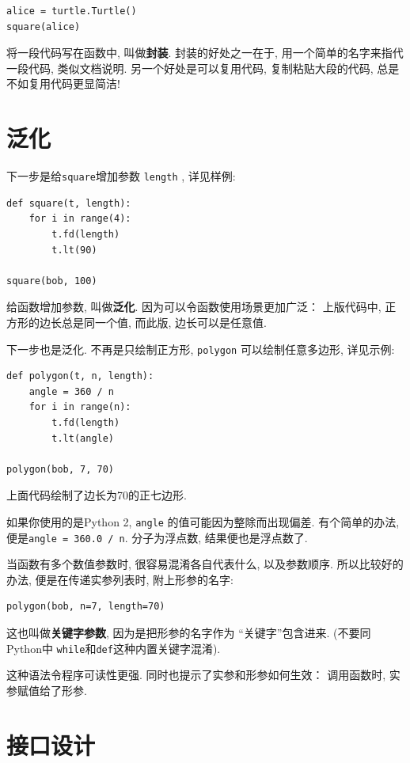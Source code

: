 \documentclass[10pt]{book}
\begin{document}
\begin{verbatim}
alice = turtle.Turtle()
square(alice)
\end{verbatim}
%
将一段代码写在函数中, 叫做{\bf 封装}. 
封装的好处之一在于, 用一个简单的名字来指代一段代码, 类似文档说明. 
另一个好处是可以复用代码, 复制粘贴大段的代码, 总是
不如复用代码更显简洁!


\section{泛化}

下一步是给{\tt square}增加参数 {\tt length} , 详见样例:

\begin{verbatim}
def square(t, length):
    for i in range(4):
        t.fd(length)
        t.lt(90)

square(bob, 100)
\end{verbatim}
%
给函数增加参数, 叫做{\bf 泛化}. 
因为可以令函数使用场景更加广泛：
上版代码中, 正方形的边长总是同一个值, 
而此版, 边长可以是任意值.

下一步也是泛化. 
不再是只绘制正方形, {\tt polygon} 可以绘制任意多边形, 详见示例:

\begin{verbatim}
def polygon(t, n, length):
    angle = 360 / n
    for i in range(n):
        t.fd(length)
        t.lt(angle)

polygon(bob, 7, 70)
\end{verbatim}
%
上面代码绘制了边长为70的正七边形. 

如果你使用的是Python 2, {\tt angle} 的值可能因为整除而出现偏差. 
有个简单的办法, 便是{\tt angle = 360.0 / n}. 分子为浮点数, 结果便也是浮点数了. 

当函数有多个数值参数时, 很容易混淆各自代表什么, 以及参数顺序. 
所以比较好的办法, 便是在传递实参列表时, 附上形参的名字:

\begin{verbatim}
polygon(bob, n=7, length=70)
\end{verbatim}
%
这也叫做{\bf 关键字参数}, 因为是把形参的名字作为 ``关键字''包含进来. 
(不要同Python中 {\tt while}和{\tt def}这种内置关键字混淆). 

这种语法令程序可读性更强. 同时也提示了实参和形参如何生效：
调用函数时, 实参赋值给了形参. 


\section{接口设计}
\end{document}
